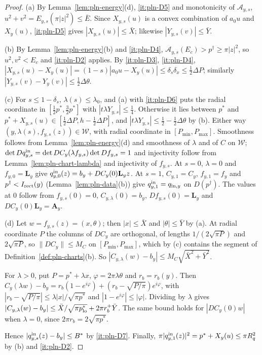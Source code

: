 \begin{proof}
(a) By Lemma~\ref{lem:pln-energy}(d), \ref{it:pln-D5} and monotonicity of $\mathcal A_{y,s}$, $u^2+v^2=E_{y,s}(\pi|z|^2)\le\bar E$. Since $X_{y,s}(u)$ is a convex combination of $a_0u$ and $X_y(u)$, \ref{it:pln-D5} gives $|X_{y,s}(u)|\le\bar X$; likewise $|Y_{y,s}(v)|\le\bar Y$.

(b) By Lemma~\ref{lem:pln-energy}(b) and \ref{it:pln-D4}, $\mathcal A_{y,s}(E_c)>p^\dagger\ge\pi|z|^2$, so $u^2,v^2<E_c$ and \ref{it:pln-D2} applies. By \ref{it:pln-D3}, \ref{it:pln-D4}, $|X_{y,s}(u)-X_y(u)|=(1-s)|a_0u-X_y(u)|\le\delta_s\delta_x\le\frac12\Delta P$; similarly $|Y_{y,s}(v)-Y_y(v)|\le\frac12\Delta\theta$.

(c) For $s\le1-\delta_s$, $\lambda(s)\le\lambda_0$, and (a) with \ref{it:pln-D6} puts the radial coordinate in $[\frac12p^*,\frac32p^*]$ with $|t\lambda Y_{y,s}|\le\frac14$. Otherwise it lies between $p^*$ and $p^*+X_{y,s}(u)\in[\frac12\Delta P,h-\frac12\Delta P]$, and $|t\lambda Y_{y,s}|\le\frac12-\frac12\Delta\theta$ by (b). Either way $(y,\lambda(s),f_{y,s}(z))\in\mathcal W$, with radial coordinate in $[P_{\min},P_{\max}]$. Smoothness follows from Lemma~\ref{lem:pln-energy}(d) and smoothness of $\lambda$ and of $C$ on $\mathcal W$; $\det Dq^{\rm in}_{y,s}=\det DC_y(\lambda f_{y,s})\det Df_{y,s}=1$ and injectivity follow from Lemma~\ref{lem:pln-chart-lambda} and injectivity of $f_{y,s}$. At $s=0$, $\lambda=0$ and $f_{y,0}=\mathbf L_y$ give $q^{\rm in}_{y,0}(z)=b_y+DC_y(0)\mathbf L_yz$. At $s=1$, $C_{y,1}=C_y$, $f_{y,1}=f_y$ and $p^\dagger<I_{\rm rect}(y)$ (Lemma~\ref{lem:pln-data}(b)) give $q^{\rm in}_{y,1}=q_{{\rm in},y}$ on $D(p^\dagger)$. The values at $0$ follow from $f_{y,s}(0)=0$, $C_{y,\lambda}(0)=b_y$, $Df_{y,s}(0)=\mathbf L_y$ and $DC_y(0)\mathbf L_y=\mathbf A_y$.

(d) Let $w=f_{y,s}(z)=(x,\theta)$; then $|x|\le\bar X$ and $|\theta|\le\bar Y$ by (a). At radial coordinate $P$ the columns of $DC_y$ are orthogonal, of lengths $1/(2\sqrt{\pi P})$ and $2\sqrt{\pi P}$, so $\|DC_y\|\le M_C$ on $[P_{\min},P_{\max}]$, which by (c) contains the segment of Definition~\ref{def:pln-charts}(b). So $|C_{y,\lambda}(w)-b_y|\le M_C\sqrt{\bar X^2+\bar Y^2}$.

For $\lambda>0$, put $P=p^*+\lambda x$, $\varphi=2\pi\lambda\theta$ and $r_b=r_b(y)$. Then $C_y(\lambda w)-b_y=r_b(1-e^{i\varphi})+(r_b-\sqrt{P/\pi})e^{i\varphi}$, with $|r_b-\sqrt{P/\pi}|\le\lambda|x|/\sqrt{\pi p^*}$ and $|1-e^{i\varphi}|\le|\varphi|$. Dividing by $\lambda$ gives $|C_{y,\lambda}(w)-b_y|\le\bar X/\sqrt{\pi p^*_{\rm lo}}+2\pi r_b^+\bar Y$. The same bound holds for $|DC_y(0)w|$ when $\lambda=0$, since $2\pi r_b=2\sqrt{\pi p^*}$.

Hence $|q^{\rm in}_{y,s}(z)-b_y|\le B^*$ by \ref{it:pln-D7}. Finally, $\pi|q^{\rm in}_{y,1}(z)|^2=p^*+X_y(u)\le\pi R_q^2$ by (b) and \ref{it:pln-D2}.
\end{proof}


